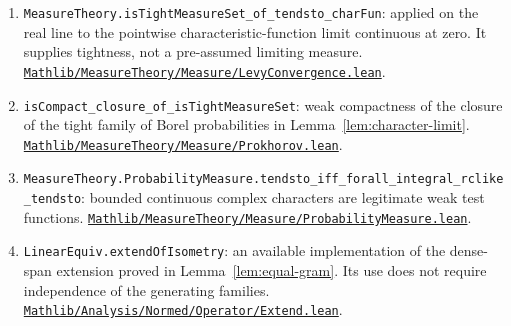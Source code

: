 \documentclass[reqno,a4paper,12pt]{amsart}
\theoremstyle{definition}
\newcommand{\ml}[1]{\nolinkurl{#1}}
\begin{document}
\begin{enumerate}
\item \ml{MeasureTheory.isTightMeasureSet_of_tendsto_charFun}: applied on the real line to the pointwise characteristic-function limit continuous at zero. It supplies tightness, not a pre-assumed limiting measure.
\href{https://github.com/leanprover-community/mathlib4/blob/1ddfaa9548e05b343be9248ae08b73c3425b446e/Mathlib/MeasureTheory/Measure/LevyConvergence.lean#L43}{\ml{Mathlib/MeasureTheory/Measure/LevyConvergence.lean}}.
\item \ml{isCompact_closure_of_isTightMeasureSet}: weak compactness of the closure of the tight family of Borel probabilities in Lemma~\ref{lem:character-limit}.
\href{https://github.com/leanprover-community/mathlib4/blob/1ddfaa9548e05b343be9248ae08b73c3425b446e/Mathlib/MeasureTheory/Measure/Prokhorov.lean#L553}{\ml{Mathlib/MeasureTheory/Measure/Prokhorov.lean}}.
\item \ml{MeasureTheory.ProbabilityMeasure.tendsto_iff_forall_integral_rclike_tendsto}: bounded continuous complex characters are legitimate weak test functions.
\href{https://github.com/leanprover-community/mathlib4/blob/1ddfaa9548e05b343be9248ae08b73c3425b446e/Mathlib/MeasureTheory/Measure/ProbabilityMeasure.lean#L374}{\ml{Mathlib/MeasureTheory/Measure/ProbabilityMeasure.lean}}.
\item \ml{LinearEquiv.extendOfIsometry}: an available implementation of the dense-span extension proved in Lemma~\ref{lem:equal-gram}. Its use does not require independence of the generating families.
\href{https://github.com/leanprover-community/mathlib4/blob/1ddfaa9548e05b343be9248ae08b73c3425b446e/Mathlib/Analysis/Normed/Operator/Extend.lean#L305}{\ml{Mathlib/Analysis/Normed/Operator/Extend.lean}}.
\end{enumerate}
\endgroup
\end{document}
